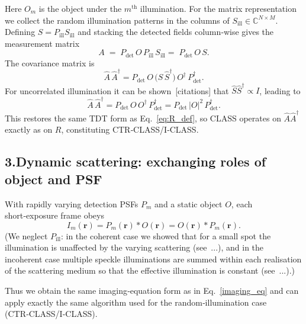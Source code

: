 \documentclass[12pt]{article}
\begin{document}
Here $O_m$ is the object under the $m^{\text{th}}$ illumination.  For the
matrix representation we collect the random illumination patterns in the
columns of $S_{\text{ill}}\in\mathbb{C}^{N\times M}$.
Defining $S = P_{\text{ill}} S_{\text{ill}}$ and stacking the detected
fields column‑wise gives the measurement matrix
\begin{equation}
A \;=\; P_{\text{det}}\,
        O\,
        P_{\text{ill}}\,
        S_{\text{ill}}
     =\; P_{\text{det}}\,
        O\,
        S.
\label{eq:A_def}
\end{equation}
The covariance matrix is
\begin{equation}
\hat{A}\,\hat{A}^{\dagger}
      = P_{\text{det}}\,
        O\,
        \bigl(\hat{S}\,\hat{S}^{\dagger}\bigr)\,
        O^{\dagger}\,
        P_{\text{det}}^{\dagger}.
\label{eq:A_cov}
\end{equation}
For uncorrelated illumination it can be shown [citations] that
$\hat{S}\hat{S}^{\dagger}\propto I$, leading to
\begin{equation}
\hat{A}\,\hat{A}^{\dagger}
      = P_{\text{det}}\,
        O\,O^{\dagger}\,
        P_{\text{det}}^{\dagger}
      = P_{\text{det}}\,
        |O|^{2}\,
        P_{\text{det}}^{\dagger}.
\label{eq:A_cov2}
\end{equation}
This restores the same TDT form as Eq.~\eqref{eq:R_def}, so CLASS operates
on $\hat{A}\hat{A}^{\dagger}$ exactly as on $R$, constituting
CTR‑CLASS/I‑CLASS.

\subsection{3.\quad Dynamic scattering: exchanging roles of object and PSF}
\label{subsec:dyn_class}

With rapidly varying detection PSFs $P_{m}$ and a static object $O$, each
short‑exposure frame obeys
\[
I_{m}(\mathbf r)
  = P_{m}(\mathbf r)\ast O(\mathbf r)
  = O(\mathbf r)\ast P_{m}(\mathbf r).
\]
(We neglect $P_{\text{ill}}$: in the coherent case we showed that for a
small spot the illumination is unaffected by the varying scattering
(see~...), and in the incoherent case multiple speckle illuminations are
summed within each realisation of the scattering medium so that the
effective illumination is constant (see~...).)

Thus we obtain the same imaging‑equation form as in
Eq.~\eqref{imaging_eq} and can apply exactly the same algorithm used for
the random‑illumination case (CTR‑CLASS/I‑CLASS).
\end{document}
